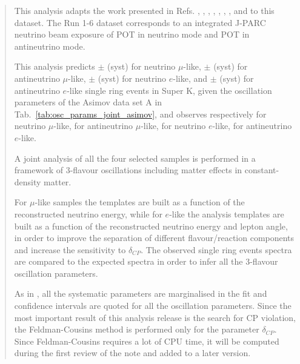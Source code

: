 \begin{frontmatter}
\begin{abstract}
This analysis adapts the work presented in Refs. 
\cite{OurRun1DisappAnalysis},
\cite{OurRun12DisappAnalysis}, 
\cite{OurRun12DisappAnalysis3Flavour},
\cite{OurRun123DisappAnalysis3Flavour},
\cite{OurRun1234aDisappAnalysis3Flavour},
\cite{OurRun1234DisappAnalysis3Flavour},
\cite{OurRun123JointOscillationAnalysis},
\cite{OurRun1234JointOscillationAnalysis}
\cite{OurRun56AntiNumuDisappearanceAnalysis3Flavour} 
and
\cite{OurRun56AntiNueBarAppearanceAnalysis3Flavour}
to this dataset.
The Run 1-6 dataset corresponds to an integrated J-PARC neutrino beam
exposure of \TotalPotNu{} POT in neutrino mode and
\TotalPotNuBar{} POT in antineutrino mode.

This analysis predicts 
\NskOscExpectationNumu{} $\pm$ \NskOscExpectationNumuError{} (syst) for neutrino $\mu$-like,
\NskOscExpectationNumuBar{} $\pm$ \NskOscExpectationNumuBarError{} (syst) for antineutrino $\mu$-like,
\NskOscExpectationNue{} $\pm$ \NskOscExpectationNueError{} (syst) for neutrino $e$-like,
and
\NskOscExpectationNueBar{} $\pm$ \NskOscExpectationNueBarError{} (syst) for antineutrino $e$-like
single ring events in Super K,
given the oscillation parameters of the Asimov data set A in Tab.~\ref{tab:osc_params_joint_asimov},
and observes respectively 
\NskObservedNumu{} for neutrino $\mu$-like,
\NskObservedNumuBar{}  for antineutrino $\mu$-like,
\NskObservedNue{}  for neutrino $e$-like,
\NskObservedNueBar{}  for antineutrino $e$-like.

A joint analysis of all the four selected samples is performed 
in a framework of 3-flavour oscillations including matter effects in constant-density matter.

For $\mu$-like samples the templates are built as a function of the reconstructed neutrino energy,
while for $e$-like the analysis templates are built as a function of the reconstructed neutrino energy and lepton angle,
in order to improve the separation of different flavour/reaction components
and increase the sensitivity to $\delta_{CP}$.
The observed single ring events spectra are compared to the expected spectra 
in order to infer all the 3-flavour oscillation parameters.

As in \cite{OurRun56AntiNueBarAppearanceAnalysis3Flavour},
all the systematic parameters are marginalised \cite{CousinsHighland} in the fit and 
confidence intervals are quoted for all the oscillation parameters.
Since the most important result of this analysis release is the search for CP violation,
the Feldman-Cousins method \cite{FeldmanCousins} is performed only for the parameter $\delta_{CP}$. 
Since Feldman-Cousins requires a lot of CPU time, it will be computed during the first review of the note
and added to a later version.

\end{abstract}

\end{frontmatter}
